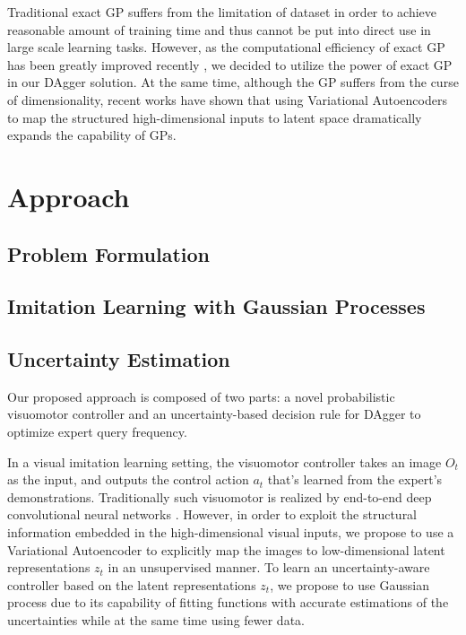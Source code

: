 \documentclass[11pt, reqno, letterpaper, twoside]{amsart}
\begin{document}
Traditional exact GP suffers from the limitation of dataset in order to achieve reasonable amount of training time and thus cannot be put into direct use in large scale learning tasks. However, as the computational efficiency of exact GP has been greatly improved recently \cite{exact-gp-million,GPyTorch}, we decided to utilize the power of exact GP in our DAgger solution. At the same time, although the GP suffers from the curse of dimensionality, recent works have shown that using Variational Autoencoders to map the structured high-dimensional inputs to latent space \cite{grosnit2021high} dramatically expands the capability of GPs.

\section{Approach}
\subsection{Problem Formulation}

\subsection{Imitation Learning with Gaussian Processes}

\subsection{Uncertainty Estimation}


Our proposed approach is composed of two parts: a novel probabilistic visuomotor controller and an uncertainty-based decision rule for DAgger to optimize expert query frequency.

In a visual imitation learning setting, the visuomotor controller takes an image $O_t$ as the input, and outputs the control action $a_t$ that's learned from the expert's demonstrations. Traditionally such visuomotor is realized by end-to-end deep convolutional neural networks \cite{pmlr-v78-finn17a}. However, in order to exploit the structural information embedded in the high-dimensional visual inputs, we propose to use a Variational Autoencoder to explicitly map the images to low-dimensional latent representations $z_t$ in an unsupervised manner. To learn an uncertainty-aware controller based on the latent representations $z_t$, we propose to use Gaussian process due to its capability of fitting functions with accurate estimations of the uncertainties while at the same time using fewer data.
\end{document}
